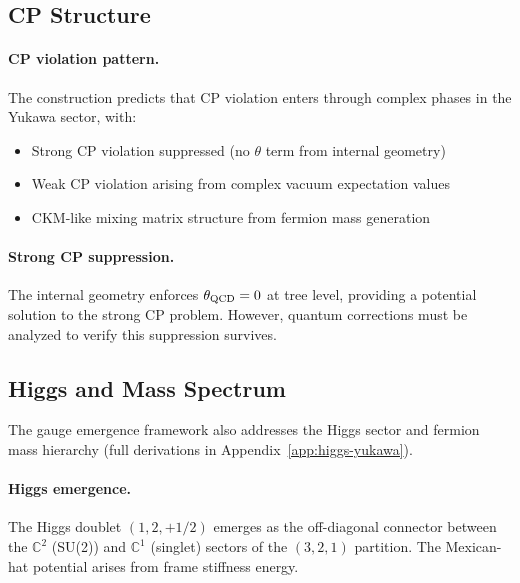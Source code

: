 \subsection{CP Structure}\label{sec:quantum-cp}

\paragraph{CP violation pattern.}
The construction predicts that CP violation enters through complex phases in the Yukawa sector, with:
\begin{itemize}
\item Strong CP violation suppressed (no $\theta$ term from internal geometry)
\item Weak CP violation arising from complex vacuum expectation values
\item CKM-like mixing matrix structure from fermion mass generation
\end{itemize}

\paragraph{Strong CP suppression.}
The internal geometry enforces $\theta_{\rm QCD} = 0$ at tree level, providing a potential solution to the strong CP problem. However, quantum corrections must be analyzed to verify this suppression survives.

\subsection{Higgs and Mass Spectrum}\label{sec:quantum-higgs}

The gauge emergence framework also addresses the Higgs sector and fermion mass hierarchy (full derivations in Appendix~\ref{app:higgs-yukawa}).

\paragraph{Higgs emergence.}
The Higgs doublet $(1, 2, +1/2)$ emerges as the off-diagonal connector between the $\mathbb{C}^2$ (SU(2)) and $\mathbb{C}^1$ (singlet) sectors of the $(3,2,1)$ partition. The Mexican-hat potential arises from frame stiffness energy.

